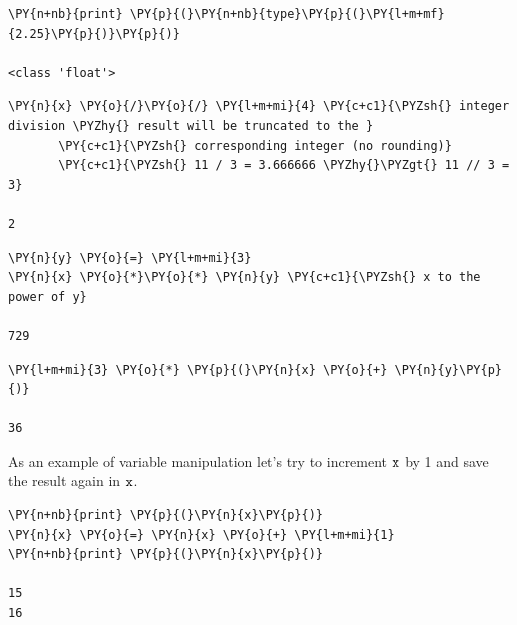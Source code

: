\begin{codebox}            
\begin{Verbatim}[commandchars=\\\{\}]
\PY{n+nb}{print} \PY{p}{(}\PY{n+nb}{type}\PY{p}{(}\PY{l+m+mf}{2.25}\PY{p}{)}\PY{p}{)}

<class 'float'>
\end{Verbatim}
\end{codebox}

\begin{codebox}            
\begin{Verbatim}[commandchars=\\\{\}]
\PY{n}{x} \PY{o}{/}\PY{o}{/} \PY{l+m+mi}{4} \PY{c+c1}{\PYZsh{} integer division \PYZhy{} result will be truncated to the }
       \PY{c+c1}{\PYZsh{} corresponding integer (no rounding)}
       \PY{c+c1}{\PYZsh{} 11 / 3 = 3.666666 \PYZhy{}\PYZgt{} 11 // 3 = 3}

2
\end{Verbatim}
\end{codebox}

\begin{codebox}            
\begin{Verbatim}[commandchars=\\\{\}]
\PY{n}{y} \PY{o}{=} \PY{l+m+mi}{3}
\PY{n}{x} \PY{o}{*}\PY{o}{*} \PY{n}{y} \PY{c+c1}{\PYZsh{} x to the power of y}

729
\end{Verbatim}
\end{codebox}

\begin{codebox}            
\begin{Verbatim}[commandchars=\\\{\}]
\PY{l+m+mi}{3} \PY{o}{*} \PY{p}{(}\PY{n}{x} \PY{o}{+} \PY{n}{y}\PY{p}{)}

36
\end{Verbatim}
\end{codebox}

As an example of variable manipulation let's try to increment \(\tt{x}\) by 1 and save the result again in \(\tt{x}\).

\begin{codebox}            
\begin{Verbatim}[commandchars=\\\{\}]
\PY{n+nb}{print} \PY{p}{(}\PY{n}{x}\PY{p}{)}
\PY{n}{x} \PY{o}{=} \PY{n}{x} \PY{o}{+} \PY{l+m+mi}{1}
\PY{n+nb}{print} \PY{p}{(}\PY{n}{x}\PY{p}{)}

15
16
\end{Verbatim}
\end{codebox}

